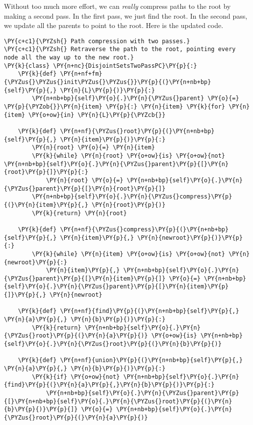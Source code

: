 Without too much more effort, we can \emph{really} compress paths to the root by making a second pass.
In the first pass, we just find the root.  In the second pass, we update all the parents to point to the root.
Here is the updated code.

\begin{Verbatim}[commandchars=\\\{\}]
\PY{c+c1}{\PYZsh{} Path compression with two passes.}
\PY{c+c1}{\PYZsh{} Retraverse the path to the root, pointing every node all the way up to the new root.}
\PY{k}{class} \PY{n+nc}{DisjointSetsTwoPassPC}\PY{p}{:}
    \PY{k}{def} \PY{n+nf+fm}{\PYZus{}\PYZus{}init\PYZus{}\PYZus{}}\PY{p}{(}\PY{n+nb+bp}{self}\PY{p}{,} \PY{n}{L}\PY{p}{)}\PY{p}{:}
        \PY{n+nb+bp}{self}\PY{o}{.}\PY{n}{\PYZus{}parent} \PY{o}{=} \PY{p}{\PYZob{}}\PY{n}{item} \PY{p}{:} \PY{n}{item} \PY{k}{for} \PY{n}{item} \PY{o+ow}{in} \PY{n}{L}\PY{p}{\PYZcb{}}

    \PY{k}{def} \PY{n+nf}{\PYZus{}root}\PY{p}{(}\PY{n+nb+bp}{self}\PY{p}{,} \PY{n}{item}\PY{p}{)}\PY{p}{:}
        \PY{n}{root} \PY{o}{=} \PY{n}{item}
        \PY{k}{while} \PY{n}{root} \PY{o+ow}{is} \PY{o+ow}{not} \PY{n+nb+bp}{self}\PY{o}{.}\PY{n}{\PYZus{}parent}\PY{p}{[}\PY{n}{root}\PY{p}{]}\PY{p}{:}
            \PY{n}{root} \PY{o}{=} \PY{n+nb+bp}{self}\PY{o}{.}\PY{n}{\PYZus{}parent}\PY{p}{[}\PY{n}{root}\PY{p}{]}
        \PY{n+nb+bp}{self}\PY{o}{.}\PY{n}{\PYZus{}compress}\PY{p}{(}\PY{n}{item}\PY{p}{,} \PY{n}{root}\PY{p}{)}
        \PY{k}{return} \PY{n}{root}

    \PY{k}{def} \PY{n+nf}{\PYZus{}compress}\PY{p}{(}\PY{n+nb+bp}{self}\PY{p}{,} \PY{n}{item}\PY{p}{,} \PY{n}{newroot}\PY{p}{)}\PY{p}{:}
        \PY{k}{while} \PY{n}{item} \PY{o+ow}{is} \PY{o+ow}{not} \PY{n}{newroot}\PY{p}{:}
            \PY{n}{item}\PY{p}{,} \PY{n+nb+bp}{self}\PY{o}{.}\PY{n}{\PYZus{}parent}\PY{p}{[}\PY{n}{item}\PY{p}{]} \PY{o}{=} \PY{n+nb+bp}{self}\PY{o}{.}\PY{n}{\PYZus{}parent}\PY{p}{[}\PY{n}{item}\PY{p}{]}\PY{p}{,} \PY{n}{newroot}

    \PY{k}{def} \PY{n+nf}{find}\PY{p}{(}\PY{n+nb+bp}{self}\PY{p}{,} \PY{n}{a}\PY{p}{,} \PY{n}{b}\PY{p}{)}\PY{p}{:}
        \PY{k}{return} \PY{n+nb+bp}{self}\PY{o}{.}\PY{n}{\PYZus{}root}\PY{p}{(}\PY{n}{a}\PY{p}{)} \PY{o+ow}{is} \PY{n+nb+bp}{self}\PY{o}{.}\PY{n}{\PYZus{}root}\PY{p}{(}\PY{n}{b}\PY{p}{)}

    \PY{k}{def} \PY{n+nf}{union}\PY{p}{(}\PY{n+nb+bp}{self}\PY{p}{,} \PY{n}{a}\PY{p}{,} \PY{n}{b}\PY{p}{)}\PY{p}{:}
        \PY{k}{if} \PY{o+ow}{not} \PY{n+nb+bp}{self}\PY{o}{.}\PY{n}{find}\PY{p}{(}\PY{n}{a}\PY{p}{,}\PY{n}{b}\PY{p}{)}\PY{p}{:}
            \PY{n+nb+bp}{self}\PY{o}{.}\PY{n}{\PYZus{}parent}\PY{p}{[}\PY{n+nb+bp}{self}\PY{o}{.}\PY{n}{\PYZus{}root}\PY{p}{(}\PY{n}{b}\PY{p}{)}\PY{p}{]} \PY{o}{=} \PY{n+nb+bp}{self}\PY{o}{.}\PY{n}{\PYZus{}root}\PY{p}{(}\PY{n}{a}\PY{p}{)}
\end{Verbatim}



